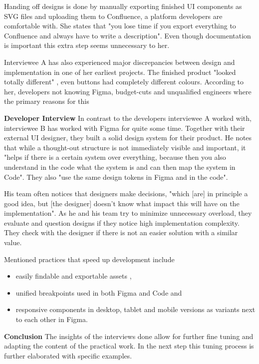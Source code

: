 Handing off designs is done by manually exporting finished UI components as SVG files and
uploading them to Confluence, a platform developers are comfortable with. She states that "you lose
time if you export everything to Confluence and always have to write a description".
 Even though documentation is important
this extra step seems unnecessary to her.

Interviewee A has also experienced major discrepancies between design and implementation in one of her
earliest projects. The finished product "looked totally different"
, even buttons had completely different
colours. According to her, developers not knowing Figma, budget-cuts and unqualified engineers where
the primary reasons for this 

\textbf{Developer Interview}
In contrast to the developers interviewee A worked with, interviewee B has worked with Figma for
quite some time. Together with their external UI designer, they built a solid design system for
their product. He notes that while a thought-out structure is not immediately visible and important,
it "helps if there is a certain system over everything, because then you also understand in the code
what the system is and can then map the system in Code".
 They also "use the same
design tokens in Figma and in the code". 

His team often notices that designers make decisions, "which [are] in principle a good idea, but
    [the designer] doesn't know what impact this will have on the implementation".
 As he and his team try to minimize
unnecessary overload, they evaluate and question designs if they notice high implementation
complexity. They check with the designer if there is not an easier solution with
a similar value. 

Mentioned practices that speed up development include
\begin{itemize}
    \item easily findable and exportable assets ,
    \item unified breakpoints used in both Figma and Code
           and
    \item responsive components in desktop, tablet and mobile versions as variants next to each
          other in Figma. 
\end{itemize}

\textbf{Conclusion}
The insights of the interviews done allow for further fine tuning and adapting the content of the
practical work. In the next step this tuning process is further elaborated with specific examples.
